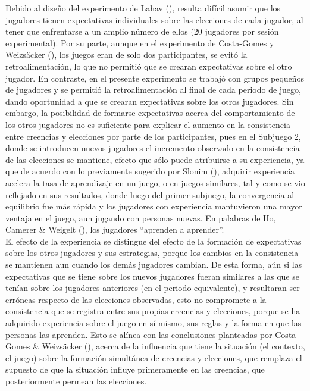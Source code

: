 Debido al diseño del experimento de Lahav (\citeyear{Lahav}), resulta difícil asumir que los jugadores tienen expectativas individuales sobre las elecciones de cada jugador, al tener que enfrentarse a un amplio número de ellos (20 jugadores por sesión experimental). Por su parte, aunque en el experimento de Costa-Gomes y Weizsäcker (\citeyear{Costa-Gomes}), los juegos eran de solo dos participantes, se evitó la retroalimentación, lo que no permitió que se crearan expectativas sobre el otro jugador. En contraste, en el presente experimento se trabajó con grupos pequeños de jugadores y se permitió la retroalimentación al final de cada periodo de juego, dando oportunidad a que se crearan expectativas sobre los otros jugadores. Sin embargo, la  posibilidad de formarse expectativas acerca del comportamiento de los otros jugadores no es suficiente para explicar el aumento en la consistencia entre creencias y elecciones por parte de los participantes, pues en el Subjuego 2, donde se introducen nuevos jugadores el incremento observado en la consistencia de las elecciones se mantiene, efecto que sólo puede atribuirse a su experiencia, ya que de acuerdo con lo previamente sugerido por Slonim (\citeyear{Slonim}), adquirir experiencia acelera la tasa de aprendizaje en un juego, o en juegos similares, tal y como se vio  reflejado en sus resultados, donde luego del primer subjuego, la convergencia al equilibrio fue más rápida y los jugadores con experiencia mantuvieron una mayor ventaja en el juego, aun jugando con personas nuevas. En palabras de Ho, Camerer & Weigelt (\citeyear{Ho}), los jugadores “aprenden a aprender”.\\

El efecto de la experiencia se distingue del efecto de la formación de expectativas sobre los otros jugadores y sus estrategias, porque los cambios en la consistencia se mantienen aun cuando los demás jugadores cambian. De esta forma, aún si las expectativas que se tiene sobre los nuevos jugadores fueran similares a las que se tenían sobre los jugadores anteriores (en el periodo equivalente), y resultaran ser erróneas respecto de las elecciones observadas, esto no compromete a la consistencia que se registra entre sus propias creencias y elecciones, porque se ha adquirido experiencia sobre el juego en sí mismo, sus reglas y la forma en que las personas las aprenden. Esto se alínea con las conclusiones planteadas por Costa-Gomes & Weizsäcker (\citeyear{Costa-Gomes}), acerca de la influencia que tiene la situación (el contexto, el juego) sobre la formación simultánea de creencias y elecciones, que remplaza el supuesto de que la situación influye primeramente en las creencias, que posteriormente permean las elecciones.\\

